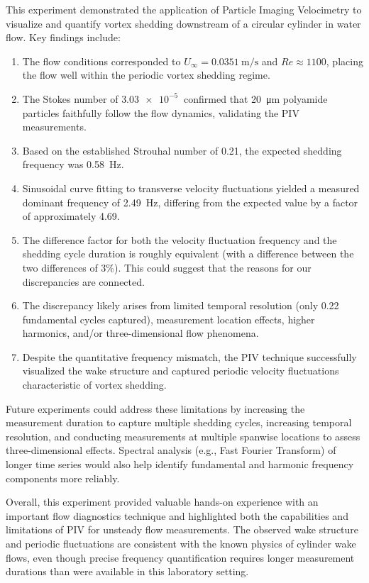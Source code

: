 This experiment demonstrated the application of Particle Imaging Velocimetry to visualize and quantify vortex shedding downstream of a circular cylinder in water flow. Key findings include:

\begin{enumerate}
    \item The flow conditions corresponded to \(U_\infty = \SI{0.0351}{\meter\per\second}\) and \(Re \approx 1100\), placing the flow well within the periodic vortex shedding regime.
    \item The Stokes number of \(\SI{3.03e-5}{}\) confirmed that \SI{20}{\micro\meter} polyamide particles faithfully follow the flow dynamics, validating the PIV measurements.
    \item Based on the established Strouhal number of 0.21, the expected shedding frequency was \SI{0.58}{\hertz}.
    \item Sinusoidal curve fitting to transverse velocity fluctuations yielded a measured dominant frequency of \SI{2.49}{\hertz}, differing from the expected value by a factor of approximately 4.69.
    \item The difference factor for both the velocity fluctuation frequency and the shedding cycle duration is roughly equivalent (with a difference between the two differences of 3\%). This could suggest that the reasons for our discrepancies are connected.
    \item The discrepancy likely arises from limited temporal resolution (only 0.22 fundamental cycles captured), measurement location effects, higher harmonics, and/or three-dimensional flow phenomena.
    \item Despite the quantitative frequency mismatch, the PIV technique successfully visualized the wake structure and captured periodic velocity fluctuations characteristic of vortex shedding.
\end{enumerate}

Future experiments could address these limitations by increasing the measurement duration to capture multiple shedding cycles, increasing temporal resolution, and conducting measurements at multiple spanwise locations to assess three-dimensional effects. Spectral analysis (e.g., Fast Fourier Transform) of longer time series would also help identify fundamental and harmonic frequency components more reliably.

Overall, this experiment provided valuable hands-on experience with an important flow diagnostics technique and highlighted both the capabilities and limitations of PIV for unsteady flow measurements. The observed wake structure and periodic fluctuations are consistent with the known physics of cylinder wake flows, even though precise frequency quantification requires longer measurement durations than were available in this laboratory setting.

